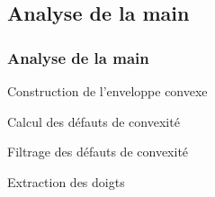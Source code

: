 \documentclass{beamer}
\begin{document}
\subsection{Analyse de la main}
\begin{frame}
  \frametitle{Analyse de la main}
  \begin{block}{}
    Construction de l'enveloppe convexe
  \end{block}
  \begin{block}{}
    Calcul des défauts de convexité
  \end{block}
  \begin{block}{}
    Filtrage des défauts de convexité
  \end{block}
  \begin{block}{}
    Extraction des doigts
  \end{block}

\end{frame}
\end{document}
